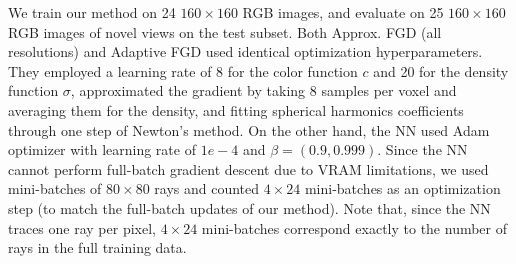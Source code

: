 \documentclass{article}
\begin{document}
We train our method on 24 $160 \times 160$ RGB images, and evaluate on 25 $160 \times 160$ RGB images of novel views on the test subset.
Both Approx. FGD (all resolutions) and Adaptive FGD used identical optimization hyperparameters.
They employed a learning rate of 8 for the color function $c$ and 20 for the density function $\sigma$, approximated the gradient by taking 8 samples per voxel and averaging them for the density, and fitting spherical harmonics coefficients through one step of Newton's method.
On the other hand, the NN used Adam optimizer with learning rate of $1e-4$ and $\beta = (0.9, 0.999)$.
Since the NN cannot perform full-batch gradient descent due to VRAM limitations, we used mini-batches of $80\times 80$ rays and counted $4 \times 24$ mini-batches as an optimization step (to match the full-batch updates of our method).
Note that, since the NN traces one ray per pixel, $4 \times 24$ mini-batches correspond exactly to the number of rays in the full training data.
\end{document}
